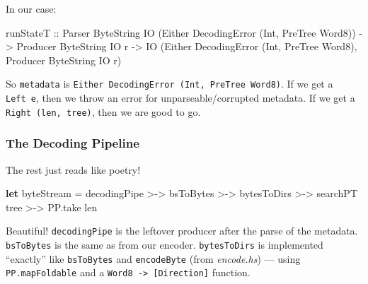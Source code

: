 \documentclass[]{article}
\newenvironment{Shaded}{}{}
\newcommand{\KeywordTok}[1]{\textcolor[rgb]{0.00,0.44,0.13}{\textbf{#1}}}
\newcommand{\DataTypeTok}[1]{\textcolor[rgb]{0.56,0.13,0.00}{#1}}
\newcommand{\OtherTok}[1]{\textcolor[rgb]{0.00,0.44,0.13}{#1}}
\newcommand{\FunctionTok}[1]{\textcolor[rgb]{0.02,0.16,0.49}{#1}}
\newcommand{\NormalTok}[1]{#1}
\begin{document}
In our case:

\begin{Shaded}
\begin{Highlighting}[]
\NormalTok{runStateT}
\OtherTok{  ::} \DataTypeTok{Parser}   \DataTypeTok{ByteString} \DataTypeTok{IO}\NormalTok{ (}\DataTypeTok{Either} \DataTypeTok{DecodingError}\NormalTok{ (}\DataTypeTok{Int}\NormalTok{, }\DataTypeTok{PreTree} \DataTypeTok{Word8}\NormalTok{))}
  \OtherTok{->} \DataTypeTok{Producer} \DataTypeTok{ByteString} \DataTypeTok{IO}\NormalTok{ r}
  \OtherTok{->} \DataTypeTok{IO}\NormalTok{ (}\DataTypeTok{Either} \DataTypeTok{DecodingError}\NormalTok{ (}\DataTypeTok{Int}\NormalTok{, }\DataTypeTok{PreTree} \DataTypeTok{Word8}\NormalTok{), }\DataTypeTok{Producer} \DataTypeTok{ByteString} \DataTypeTok{IO}\NormalTok{ r)}
\end{Highlighting}
\end{Shaded}

So \texttt{metadata} is \texttt{Either\ DecodingError\ (Int,\ PreTree\ Word8)}.
If we get a \texttt{Left\ e}, then we throw an error for unparseable/corrupted
metadata. If we get a \texttt{Right\ (len,\ tree)}, then we are good to go.

\subsubsection{The Decoding Pipeline}\label{the-decoding-pipeline}

The rest just reads like poetry!

\begin{Shaded}
\begin{Highlighting}[]
\KeywordTok{let}\NormalTok{ byteStream }\FunctionTok{=}\NormalTok{ decodingPipe }\FunctionTok{>->}\NormalTok{ bsToBytes}
             \FunctionTok{>->}\NormalTok{ bytesToDirs  }\FunctionTok{>->}\NormalTok{ searchPT tree}
             \FunctionTok{>->}\NormalTok{ PP.take len}
\end{Highlighting}
\end{Shaded}

Beautiful! \texttt{decodingPipe} is the leftover producer after the parse of the
metadata. \texttt{bsToBytes} is the same as from our encoder.
\texttt{bytesToDirs} is implemented ``exactly'' like \texttt{bsToBytes} and
\texttt{encodeByte} (from \emph{encode.hs}) --- using \texttt{PP.mapFoldable}
and a \texttt{Word8\ -\textgreater{}\ {[}Direction{]}} function.
\end{document}
